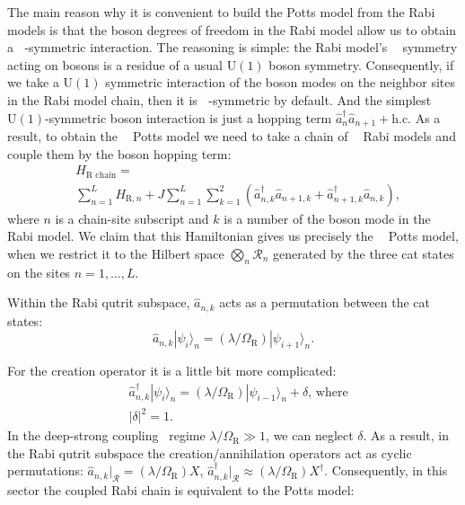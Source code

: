 \documentclass[reprint, aps, prx, amsmath, amssymb, longbibliography, superscriptaddress]{revtex4-2}
\DeclareMathOperator{\Zthree}{\mathbb{Z}_3}
\begin{document}
The main reason why it is convenient to build the Potts model from the Rabi models is that the boson degrees of freedom in the Rabi model allow us to obtain a $\Zthree$-symmetric interaction. The reasoning is simple: the Rabi model's $\Zthree$ symmetry acting on bosons is a residue of a usual $\mathrm{U(1)}$ boson symmetry. Consequently, if we take a $\mathrm{U(1)}$ symmetric interaction of the boson modes on the neighbor sites in the Rabi model chain, then it is $\Zthree$-symmetric by default. And the simplest $\mathrm{U(1)}$-symmetric boson interaction is just a hopping term $\hat a_n^{\dagger} \hat a_{n+1} + \textrm{h.c.}$ As a result, to obtain the $\Zthree$ Potts model we need to take a chain of $\Zthree$ Rabi models and couple them by the boson hopping term:
\begin{equation}
\label{coupled-rabi}
\begin{aligned}
    &H_{\text{R chain}} = \\
    &\sum\limits_{n=1}^L H_{\text{R}, n} + J \sum\limits_{n=1}^L \sum\limits_{k=1}^2\left( \hat a_{n,k}^{\dagger} \hat a_{n+1,k} + \hat a_{n+1,k}^{\dagger} \hat a_{n,k}\right),
\end{aligned}
\end{equation}
where $n$ is a chain-site subscript and $k$ is a number of the boson mode in the $ \Zthree $ Rabi model. We claim that this Hamiltonian gives us precisely the $\Zthree$ Potts model, when we restrict it to the Hilbert space $\bigotimes_n\mathcal{R}_n$ generated by the three cat states on the sites $n=1,\dots,L$.

Within the Rabi qutrit subspace,  $\hat a_{n,k}$ acts as a permutation between the cat states:
\begin{equation}
    \hat a_{n,k} |\psi_i\rangle_n = (\lambda/\Omega_{\textrm{R}})|\psi_{i+1}\rangle_n. 
\end{equation}

For the creation operator it is a little bit more complicated:
\begin{equation}
\begin{aligned}
    &\hat a_{n,k}^{\dagger} |\psi_i\rangle_n =  (\lambda/\Omega_{\textrm{R}})|\psi_{i-1}\rangle_n + \delta, \,\text{where} \\
    &|\delta|^2 = 1.
\end{aligned}
\end{equation}
In the deep-strong coupling~\cite{kozin_cavityenhanced_2025,kozin_schottky_2025} regime $\lambda/\Omega_{\text{R}} \gg 1$, we can neglect $\delta$. As a result, in the Rabi qutrit subspace the creation/annihilation operators act as cyclic permutations: $\hat a_{n,k}|_{\mathcal{R}} = (\lambda/\Omega_{\textrm{R}}) X$, $\hat a_{n,k}^{\dagger}|_{\mathcal{R}} \approx (\lambda/\Omega_{\textrm{R}}) X^{\dagger}$. Consequently, in this sector the coupled Rabi chain is equivalent to the Potts model:
\end{document}
